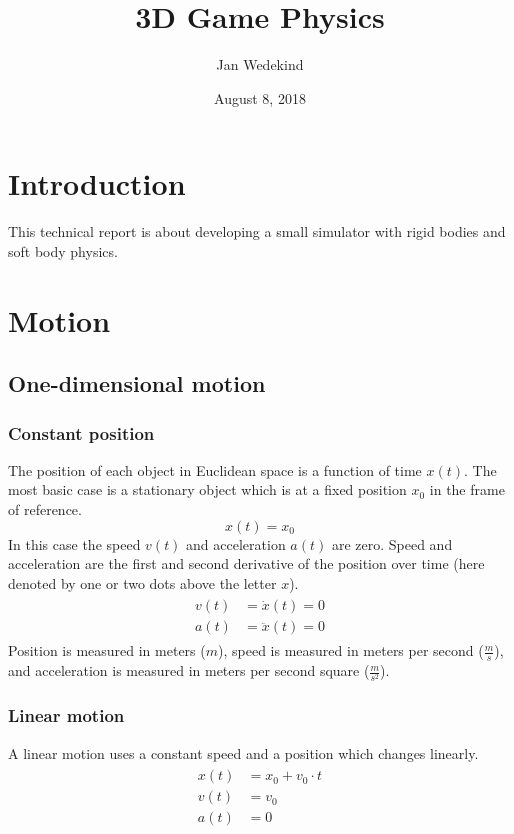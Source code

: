 \documentclass[12pt,a4paper,twoside]{article}
\title{3D Game Physics}
\author{Jan Wedekind}
\date{August 8, 2018}
\begin{document}
\maketitle

\section{Introduction}
This technical report is about developing a small simulator with rigid bodies and soft body physics.

\section{Motion}
\subsection{One-dimensional motion}
\subsubsection{Constant position}
The position of each object in Euclidean space is a function of time $x(t)$.
The most basic case is a stationary object which is at a fixed position $x_0$ in the frame of reference.
\begin{equation*}
  x(t) = x_0
\end{equation*}
In this case the speed $v(t)$ and acceleration $a(t)$ are zero.
Speed and acceleration are the first and second derivative of the position over time (here denoted by one or two dots above the letter $x$).
\begin{align*}
  \begin{split}
    v(t) & = \dot{x}(t)  = 0\\
    a(t) & = \ddot{x}(t) = 0
  \end{split}
\end{align*}
Position is measured in meters ($m$), speed is measured in meters per second ($\frac{m}{s}$), and acceleration is measured in meters per second square ($\frac{m}{s^2}$).

\subsubsection{Linear motion}
A linear motion uses a constant speed and a position which changes linearly.
\begin{align*}
  \begin{split}
    x(t) & = x_0 + v_0 \cdot t\\
    v(t) & = v_0\\
    a(t) & = 0
  \end{split}
\end{align*}
\end{document}

